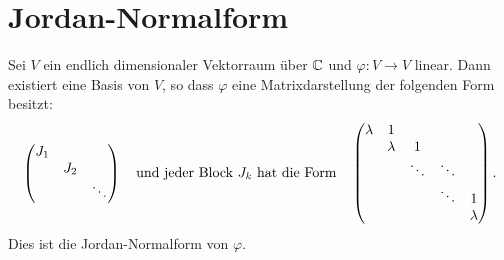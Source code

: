 \section{Jordan-Normalform}
\begin{theorem}
	Sei $V$ ein endlich dimensionaler Vektorraum über $\mathbb{C}$ und $\varphi: V \to  V$ linear.
	Dann existiert eine Basis von $V$, so dass $\varphi$ eine Matrixdarstellung der folgenden Form besitzt:
	\[
	\begin{pmatrix} 
		J_1\\
		&J_2\\
		& & \ddots
	\end{pmatrix} \qq{und jeder Block $J_{k}$ hat die Form} \begin{pmatrix} 
		\lambda &1\\
		&\lambda &1\\
		& & \ddots &\ddots\\
		& & & \ddots &1\\
		& & & &\lambda
	\end{pmatrix} 
	.\]
	Dies ist die Jordan-Normalform von $\varphi$.
\end{theorem}





















